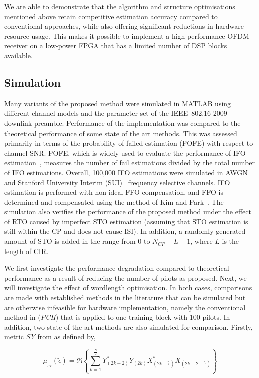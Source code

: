 We are able to demonstrate that the algorithm and structure optimisations mentioned above retain competitive estimation accuracy compared to conventional approaches, while also offering significant reductions in hardware resource usage.
This makes it possible to implement a high-performance OFDM receiver on a low-power FPGA that has a limited number of DSP blocks available.

\subsection{Simulation}
\label{sec:Sim}
Many variants of the proposed method were simulated in MATLAB using different channel models and the parameter set of the IEEE~802.16-2009 downlink preamble. Performance of the implementation was compared to the theoretical performance of some state of the art methods.
This was assessed primarily in terms of the probability of failed estimation (POFE) with respect to channel SNR.
POFE, which is widely used to evaluate the performance of IFO estimation~\cite{Park2002,Shim2006,Morelli2008}, measures the number of fail estimations divided by the total number of IFO estimations.
Overall, 100,000 IFO estimations were simulated in AWGN and Stanford University Interim (SUI)~\cite{V.ErcegJuly2003} frequency selective channels.
IFO estimation is performed with non-ideal FFO compensation, and FFO is determined and compensated using the method of Kim and Park~\cite{Kim2008}.
The simulation also verifies the performance of the proposed method under the effect of RTO caused by imperfect STO estimation (assuming that STO estimation is still within the CP and does not cause ISI).
In addition, a randomly generated amount of STO is added in the range from 0 to $N_{CP}-L-1$, where $L$ is the length of CIR.

We first investigate the performance degradation compared to theoretical performance as a result of reducing the number of pilots as proposed. Next, we will investigate the effect of wordlength optimisation.
In both cases, comparisons are made with established methods in the literature that can be simulated but are otherwise infeasible for hardware implementation, namely the conventional method in \cite{Park2002} (\emph{PCH}) that is applied to one training block with 100 pilots.
In addition,  two state of the art methods are also simulated for comparison. 
Firstly, metric \emph{SY} from \cite{Shim2006} as defined by,

\begin{equation}
\label{equ:SY}
\mu_{_{SY}}(\tilde{\epsilon}) = \Re{\left\{\sum_{k=1}^{\frac{N}{2}} Y^{*}_{(2k-2)} Y_{(2k)}  X^{*}_{(2k-\tilde{\epsilon})} X_{(2k-2-\tilde{\epsilon})}\right\}}
\end{equation}

